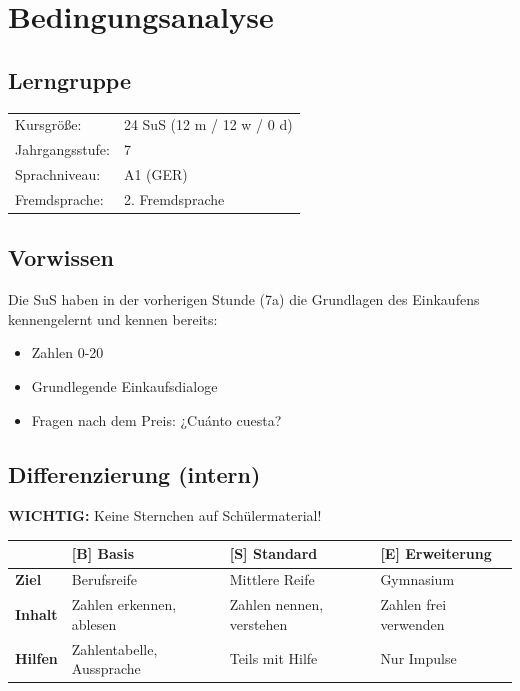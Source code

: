\documentclass[11pt,a4paper]{article}
\newcommand{\jahrgangsstufe}{7}
\newcommand{\lerngruppengroesse}{24}
\newcommand{\maennlich}{12}
\newcommand{\weiblich}{12}
\newcommand{\divers}{0}
\newcommand{\gerniveau}{A1}
\begin{document}
\section{Bedingungsanalyse}

\subsection{Lerngruppe}
\begin{tabular}{ll}
    Kursgröße: & \lerngruppengroesse{} SuS (\maennlich{} m / \weiblich{} w / \divers{} d) \\
    Jahrgangsstufe: & \jahrgangsstufe \\
    Sprachniveau: & \gerniveau{} (GER) \\
    Fremdsprache: & 2. Fremdsprache \\
\end{tabular}

\subsection{Vorwissen}
Die SuS haben in der vorherigen Stunde (7a) die Grundlagen des Einkaufens kennengelernt und kennen bereits:
\begin{itemize}
    \item Zahlen 0-20
    \item Grundlegende Einkaufsdialoge
    \item Fragen nach dem Preis: ¿Cuánto cuesta?
\end{itemize}

\subsection{Differenzierung (intern)}

\textbf{WICHTIG:} Keine Sternchen auf Schülermaterial!

\begin{tabular}{|l|p{4cm}|p{4cm}|p{4cm}|}
\hline
& \textbf{[B] Basis} & \textbf{[S] Standard} & \textbf{[E] Erweiterung} \\
\hline
\textbf{Ziel} & Berufsreife & Mittlere Reife & Gymnasium \\
\hline
\textbf{Inhalt} & Zahlen erkennen, ablesen & Zahlen nennen, verstehen & Zahlen frei verwenden \\
\hline
\textbf{Hilfen} & Zahlentabelle, Aussprache & Teils mit Hilfe & Nur Impulse \\
\hline
\end{tabular}
\end{document}
